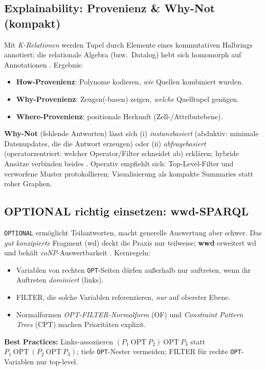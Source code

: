 \subsection{Explainability: Provenienz \& Why-Not (kompakt)}
Mit \emph{K-Relationen} werden Tupel durch Elemente eines kommutativen Halbrings annotiert; die relationale Algebra (bzw.\ Datalog) hebt sich homomorph auf Annotationen \cite{green-provenance-semirings}. Ergebnis:
\begin{itemize}
  \item \textbf{How-Provenienz}: Polynome kodieren, \emph{wie} Quellen kombiniert wurden.
  \item \textbf{Why-Provenienz}: Zeugen(-basen) zeigen, \emph{welche} Quelltupel genügen.
  \item \textbf{Where-Provenienz}: positionale Herkunft (Zell-/Attributebene).
\end{itemize}
\textbf{Why-Not} (fehlende Antworten) lässt sich (i) \emph{instanzbasiert} (abduktiv: minimale Datenupdates, die die Antwort erzeugen) oder (ii) \emph{abfragebasiert} (operatorzentriert: welcher Operator/Filter schneidet ab) erklären; hybride Ansätze verbinden beides \cite{herschel-why-why-not,herschel-survey}. Operativ empfiehlt sich: Top-Level-Filter und verworfene Muster protokollieren; Visualisierung als kompakte Summaries statt roher Graphen.

\subsection{OPTIONAL richtig einsetzen: wwd-SPARQL}
\texttt{OPTIONAL} ermöglicht Teilantworten, macht generelle Auswertung aber schwer. Das \emph{gut konzipierte} Fragment (wd) deckt die Praxis nur teilweise; \textbf{wwd} erweitert wd und behält \emph{coNP}-Auswertbarkeit \cite{kaminski-kostylev-beyond-well-designed}. Kernregeln:
\begin{itemize}
  \item Variablen von rechten \texttt{OPT}-Seiten dürfen außerhalb nur auftreten, wenn ihr Auftreten \emph{dominiert} (links).
  \item FILTER, die solche Variablen referenzieren, \emph{nur} auf oberster Ebene.
  \item Normalformen \emph{OPT-FILTER-Normalform} (OF) und \emph{Constraint Pattern Trees} (CPT) machen Prioritäten explizit.
\end{itemize}
\textbf{Best Practices:} Links-assoziieren \((P_1\ \mathrm{OPT}\ P_2)\ \mathrm{OPT}\ P_3\) statt \(P_1\ \mathrm{OPT}\ (P_2\ \mathrm{OPT}\ P_3)\); tiefe \texttt{OPT}-Nester vermeiden; FILTER für rechte \texttt{OPT}-Variablen nur top-level.

